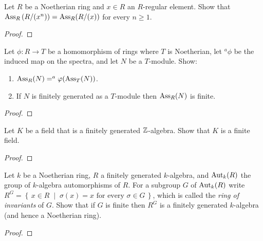 \newpage
\begin{problem}
Let $R$ be a Noetherian ring and $x\in R$ an $R$-regular
element. Show that $\operatorname{Ass}_R\left(R/(x^n)\right)=\operatorname{Ass}_R(R/(x))$ for
every $n\geq 1$.
\end{problem}
\begin{proof}
\end{proof}
\newpage
\begin{problem}
Let $\phi\colon R\to T$ be a homomorphism of rings where $T$ is
Noetherian, let $^a\phi$ be the induced map on the spectra, and
let $N$ be a $T$-module. Show:
\begin{enumerate}[label=(\alph*)]
\item $\operatorname{Ass}_R(N)=^a\varphi(\operatorname{Ass}_T(N))$.
\item If $N$ is finitely generated as a $T$-module then
  $\operatorname{Ass}_R(N)$ is finite.
\end{enumerate}
\end{problem}
\begin{proof}
\end{proof}
\newpage
\begin{problem}
Let $K$ be a field that is a finitely generated
$\mathbb{Z}$-algebra. Show that $K$ is a finite field.
\end{problem}
\begin{proof}
\end{proof}
\newpage
\begin{problem}
Let $k$ be a Noetherian ring, $R$ a finitely generated
$k$-algebra, and $\operatorname{Aut}_k(R)$ the group of $k$-algebra
automorphisms of $R$. For a subgroup $G$ of $\operatorname{Aut}_k(R)$ write
$R^G=\left\{\,x\in R\;\middle|\;\text{$\sigma(x)=x$ for every
    $\sigma\in G$}\,\right\}$, which is called the \emph{ring of
  invariants} of $G$. Show that if $G$ is finite then $R^G$ is a
finitely generated $k$-algebra (and hence a Noetherian ring).
\end{problem}
\begin{proof}
\end{proof}

